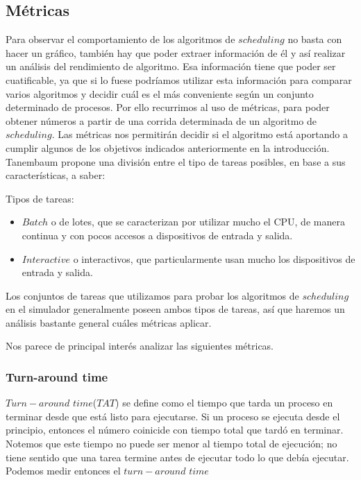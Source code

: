 \subsection{Métricas}

Para observar el comportamiento de los algoritmos de $scheduling$ no basta con hacer un gráfico, también hay que poder extraer información de él y así realizar un análisis del rendimiento de algoritmo. Esa informaci\'on tiene que poder ser cuatificable, ya que si lo fuese podr\'iamos utilizar esta informaci\'on para comparar varios algoritmos y decidir cu\'al es el m\'as conveniente seg\'un un conjunto determinado de procesos. Por ello recurrimos al uso de m\'etricas, para poder obtener n\'umeros a partir de una corrida determinada de un algoritmo de $scheduling$. Las m\'etricas nos permitir\'an decidir si el algoritmo est\'a aportando a cumplir algunos de los objetivos indicados anteriormente en la introducci\'on. Tanembaum\cite{Tanen} propone una divisi\'on entre el tipo de tareas posibles, en base a sus caracter\'isticas, a saber:

Tipos de tareas:
\begin{itemize}
	\item $Batch$ o de lotes, que se caracterizan por utilizar mucho el CPU, de manera continua y con pocos accesos a dispositivos de entrada y salida.
	\item $Interactive$ o interactivos, que particularmente usan mucho los dispositivos de entrada y salida.  
\end{itemize}

Los conjuntos de tareas que utilizamos para probar los algoritmos de $scheduling$ en el simulador generalmente poseen ambos tipos de tareas, as\'i que haremos un an\'alisis bastante general cu\'ales m\'etricas aplicar.

Nos parece de principal inter\'es analizar las siguientes m\'etricas.

\subsubsection{Turn-around time}

$Turn-around$ $time$($TAT$) se define como el tiempo que tarda un proceso en terminar desde que est\'a listo para ejecutarse. Si un proceso se ejecuta desde el principio, entonces el n\'umero coinicide con tiempo total que tard\'o en terminar. Notemos que este tiempo no puede ser menor al tiempo total de ejecuci\'on; no tiene sentido que una tarea termine antes de ejecutar todo lo que deb\'ia ejecutar. Podemos medir entonces el $turn-around$ $time$  %

